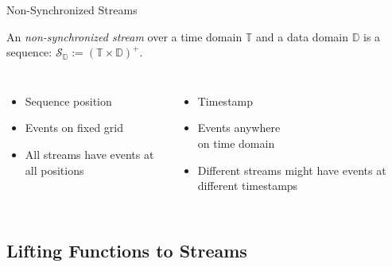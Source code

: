 \begin{frame}[t]{Non-Synchronized Streams}
  \xxx

  \begin{definition}
    An \emph{non-synchronized stream} over a time domain $\mathbb T$ and a data domain $\mathbb D$ is a sequence: $\mathcal S_{\mathbb D} := (\mathbb T \times \mathbb D)^+$.
  \end{definition}

  \xxx

  \begin{centering}
    \begin{columns}[t]
      \column{4.5cm}
      \begin{itemize}
        \item Sequence position\strut
        \item Events on fixed grid\\\strut
        \item All streams have events at all positions
      \end{itemize}

      \column{4.5cm}
      \begin{itemize}
        \item Timestamp\strut
        \item Events anywhere\\ on time domain\strut
        \item Different streams might have events at different timestamps
      \end{itemize}
    \end{columns}
  \end{centering}
\end{frame}

\subsection{Lifting Functions to Streams}

